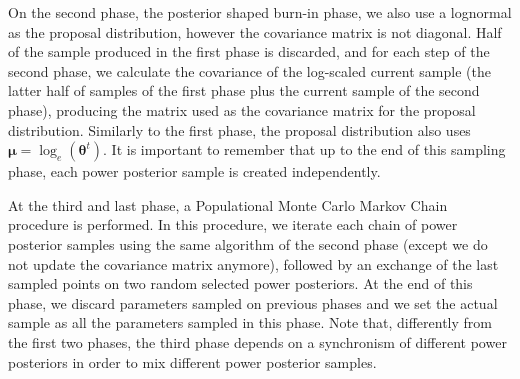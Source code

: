 On the second phase, the posterior shaped burn-in phase, we also use a 
lognormal as the proposal distribution, however the covariance matrix is 
not diagonal. Half of the sample produced in the first phase is
discarded, and for each step of the second phase, we calculate the 
covariance of the log-scaled current sample (the latter half of samples
of the first phase plus the current sample of the second phase), 
producing the matrix used as the covariance matrix for the proposal distribution. Similarly to the first phase, the
proposal distribution also uses ${\bm \mu} = \log_e({\bm \theta}^t)$. It
is important to remember that up to the end of this sampling phase, each
power posterior sample is created independently.

At the third and last phase, a Populational Monte Carlo Markov Chain
procedure is performed. In this procedure, we iterate each chain of 
power posterior samples using the same algorithm of the second phase
(except we do not update the covariance matrix anymore), followed by an 
exchange of the last sampled points on two random selected power 
posteriors. At the end of this phase, we discard parameters sampled on 
previous phases and we set the actual sample as all the parameters 
sampled in this phase. Note that, differently from the first two phases,
the third phase depends on a synchronism of different power posteriors
in order to mix different power posterior samples.

